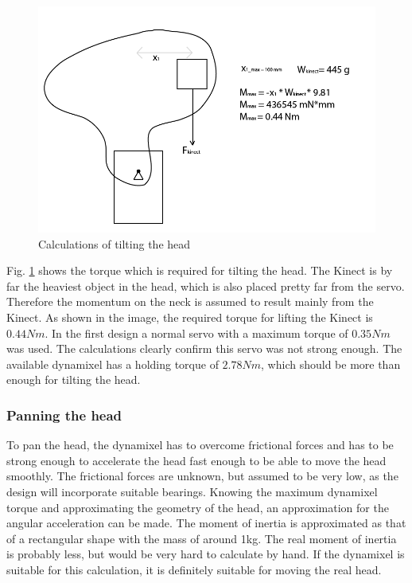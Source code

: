 \documentclass[technical_document.tex]{subfiles}
\begin{document}
\begin{figure}[ht!]
	\centering
	\mbox{\includegraphics[scale=0.4]{Images/head_tilt.png}}
	\caption{Calculations of tilting the head}
	\label{fig:head_tilt}
\end{figure}

Fig. \ref{fig:head_tilt} shows the torque which is required for tilting the head. The Kinect is by far the heaviest
object in the head, which is also placed pretty far from the servo. Therefore the momentum on the neck is assumed to result mainly from the Kinect. As shown in the image, the required torque
for lifting the Kinect is $0.44Nm$. In the first design a normal servo with a maximum torque of $0.35Nm$ was used. The calculations clearly confirm this servo was not strong enough. The available dynamixel has a holding torque of $2.78Nm$, which should be more than enough for tilting the head.

\subsubsection{Panning the head}
\label{subsection:panHead}

To pan the head, the dynamixel has to overcome frictional forces and has to be strong enough to accelerate the head fast enough to be able to move the head smoothly. The frictional forces are unknown, but assumed to be very low, as the design will incorporate suitable bearings. Knowing
the maximum dynamixel torque and approximating the geometry of the head, an approximation for the angular acceleration can be made. The moment of inertia is approximated as that of a rectangular shape with the mass of around 1kg. The real moment of inertia is probably less, but would be very hard to calculate by hand. If the dynamixel is suitable for this calculation, it is definitely suitable for moving the real head.
\end{document}
